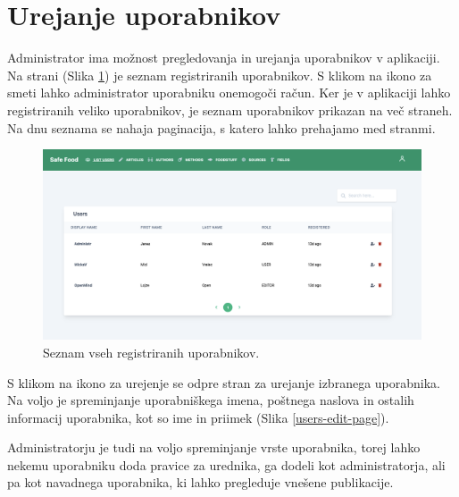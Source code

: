 \documentclass[a4paper, 12pt]{book}
\begin{document}
\section{Urejanje uporabnikov}
\label{administracija-uporabnikov}
Administrator ima možnost pregledovanja in urejanja uporabnikov v aplikaciji. Na strani  (Slika \ref{users-list-page}) je seznam registriranih uporabnikov. S klikom na ikono za smeti lahko administrator uporabniku onemogoči račun. Ker je v aplikaciji lahko registriranih veliko uporabnikov, je seznam uporabnikov prikazan na več straneh. Na dnu seznama se nahaja paginacija, s katero lahko prehajamo med stranmi.

\begin{figure}[h]
\begin{center}
\includegraphics[width=1\textwidth]{slike/users-list.png}
\end{center}
\caption{ Seznam vseh registriranih uporabnikov. }
\label{users-list-page}
\end{figure}

S klikom na ikono za urejenje se odpre stran za urejanje izbranega uporabnika. Na voljo je spreminjanje uporabniškega imena, poštnega naslova in ostalih informacij uporabnika, kot so ime in priimek (Slika \ref{users-edit-page}). 

Administratorju je tudi na voljo spreminjanje vrste uporabnika, torej lahko nekemu uporabniku doda pravice za urednika, ga dodeli kot administratorja, ali pa kot navadnega uporabnika, ki lahko pregleduje vnešene publikacije.
\end{document}
